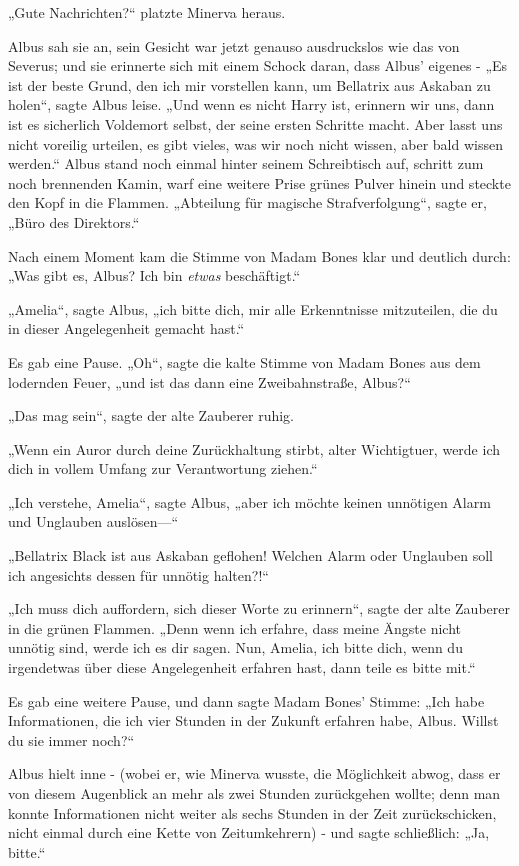 {„Gute Nachrichten?“ platzte Minerva heraus.

Albus sah sie an, sein Gesicht war jetzt genauso ausdruckslos wie das von Severus; und sie erinnerte sich mit einem Schock daran, dass Albus' eigenes - „Es ist der beste Grund, den ich mir vorstellen kann, um Bellatrix aus Askaban zu holen“, sagte Albus leise. „Und wenn es nicht Harry ist, erinnern wir uns, dann ist es sicherlich Voldemort selbst, der seine ersten Schritte macht. Aber lasst uns nicht voreilig urteilen, es gibt vieles, was wir noch nicht wissen, aber bald wissen werden.“ Albus stand noch einmal hinter seinem Schreibtisch auf, schritt zum noch brennenden Kamin, warf eine weitere Prise grünes Pulver hinein und steckte den Kopf in die Flammen. „Abteilung für magische Strafverfolgung“, sagte er, „Büro des Direktors.“

Nach einem Moment kam die Stimme von Madam Bones klar und deutlich durch: „Was gibt es, Albus? Ich bin \emph{etwas} beschäftigt.“

„Amelia“, sagte Albus, „ich bitte dich, mir alle Erkenntnisse mitzuteilen, die du in dieser Angelegenheit gemacht hast.“

Es gab eine Pause. „Oh“, sagte die kalte Stimme von Madam Bones aus dem lodernden Feuer, „und ist das dann eine Zweibahnstraße, Albus?“

„Das mag sein“, sagte der alte Zauberer ruhig.

„Wenn ein Auror durch deine Zurückhaltung stirbt, alter Wichtigtuer, werde ich dich in vollem Umfang zur Verantwortung ziehen.“

„Ich verstehe, Amelia“, sagte Albus, „aber ich möchte keinen unnötigen Alarm und Unglauben auslösen—“

„Bellatrix Black ist aus Askaban geflohen! Welchen Alarm oder Unglauben soll ich angesichts dessen für unnötig halten?!“

„Ich muss dich auffordern, sich dieser Worte zu erinnern“, sagte der alte Zauberer in die grünen Flammen. „Denn wenn ich erfahre, dass meine Ängste nicht unnötig sind, werde ich es dir sagen. Nun, Amelia, ich bitte dich, wenn du irgendetwas über diese Angelegenheit erfahren hast, dann teile es bitte mit.“

Es gab eine weitere Pause, und dann sagte Madam Bones' Stimme: „Ich habe Informationen, die ich vier Stunden in der Zukunft erfahren habe, Albus. Willst du sie immer noch?“

Albus hielt inne - (wobei er, wie Minerva wusste, die Möglichkeit abwog, dass er von diesem Augenblick an mehr als zwei Stunden zurückgehen wollte; denn man konnte Informationen nicht weiter als sechs Stunden in der Zeit zurückschicken, nicht einmal durch eine Kette von Zeitumkehrern) - und sagte schließlich: „Ja, bitte.“

}
